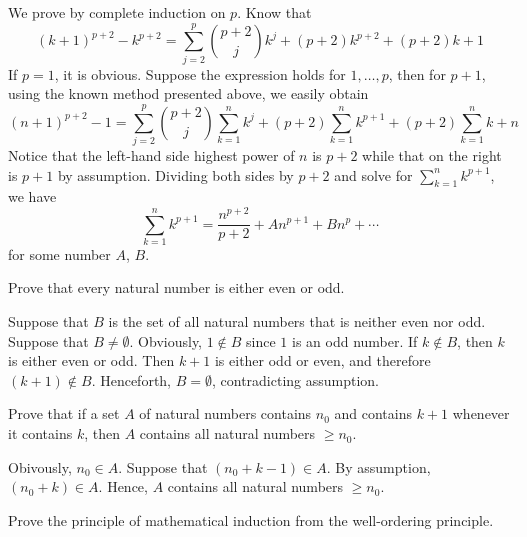 \begin{solution} %
  We prove by complete induction on $p$. Know that
  \begin{equation*}
    (k+1)^{p+2} - k^{p+2}
  = \sum_{j=2}^{p} \binom{p+2}{j}k^j
  + (p+2)k^{p+2} + (p+2)k + 1
  \end{equation*}
  If $p=1$, it is obvious. Suppose the expression holds
  for $1,\dots,p$, then for $p+1$,
  using the known method presented above, we easily obtain
  \begin{equation*}
    (n+1)^{p+2} - 1
  = \sum_{j=2}^{p} \binom{p+2}{j} \sum_{k=1}^n k^j
  + (p+2)\sum_{k=1}^n k^{p+1} + (p+2)\sum_{k=1}^n k + n
  \end{equation*}
  Notice that the left-hand side highest power of $n$ is
  $p+2$ while that on the right is $p+1$ by assumption.
  Dividing both sides by $p+2$ and solve for
  $\sum_{k=1}^n k^{p+1}$, we have
  \begin{equation*}
    \sum_{k=1}^n k^{p+1}
  = \frac{n^{p+2}}{p+2} + An^{p+1} + Bn^p + \cdots
  \end{equation*}
  for some number $A$, $B$.
\end{solution}

\begin{pr} %
  Prove that every natural number is either even or odd.
\end{pr}

\begin{solution} %
  Suppose that $B$
  is the set of all natural numbers that is neither even
  nor odd. Suppose that $B\neq\emptyset$. Obviously,
  $1\notin B$ since $1$ is an odd number. If $k \notin B$,
  then $k$ is either even or odd. Then $k + 1$ is either
  odd or even, and therefore $(k+1) \notin B$. Henceforth,
  $B = \emptyset$, contradicting assumption.
\end{solution}

\begin{pr} %
  Prove that if a set $A$ of natural numbers contains $n_0$
  and contains $k+1$ whenever it contains $k$, then $A$
  contains all natural numbers $\geq n_0$.
\end{pr}

\begin{solution} %
  Obivously, $n_0 \in A$. Suppose that $(n_0 + k - 1) \in A$.
  By assumption, $(n_0 + k) \in A$. Hence, $A$ contains all
  natural numbers $\geq n_0$.
\end{solution}

\begin{pr} %
  Prove the principle of mathematical induction from the
  well-ordering principle.
\end{pr}

